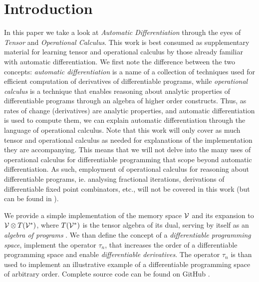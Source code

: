 \section{Introduction}\label{sec:introduction}

In this paper we take a look at \emph{Automatic Differentiation} through the eyes of \emph{Tensor} and \emph{Operational Calculus}. This work is best consumed as supplementary material for learning tensor and operational calculus by those already familiar with automatic differentiation. We first note the difference between the two concepts: \emph{automatic differentiation} is a name of a collection of techniques used for efficient computation of derivatives of differentiable programs, while \emph{operational calculus} is a technique that enables reasoning about analytic properties of differentiable programs through an algebra of higher order constructs. Thus, as rates of change (derivatives) are analytic properties, and automatic differentiation is used to compute them, we can explain automatic differentiation through the language of operational calculus. Note that this work will only cover as much tensor and operational calculus as needed for explanations of the implementation they are accompanying. This means that we will not delve into the many uses of operational calculus for differentiable programming that scope beyond automatic differentiation. As such, employment of operational calculus for reasoning about differentiable programs, ie. analysing fractional iterations, derivations of differentiable fixed point combinators, etc., will not be covered in this work (but can be found in \cite{OperationalCalculus}).

We provide a simple implementation of the memory space $\mathcal{V}$ and its expansion to $\mathcal{V}\otimes T(\mathcal{V}^*)$, where $T(\mathcal{V}^*)$ is the tensor algebra of its dual, serving by itself as an \emph{algebra of programs} \cite[Definition~4.1]{OperationalCalculus}. We than define the concept of a \emph{differentiable programming space}, implement the operator $\tau_n$, that increases the order of a differentiable programming space \cite[Proposition~5.1]{OperationalCalculus} and enable \emph{differentiable derivatives}. The operator $\tau_n$ is than used to implement an illustrative example of a differentiable programming space of arbitrary order.
Complete source code can be found on GitHub \cite{dCpp}.
